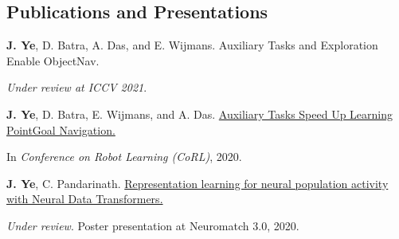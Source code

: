\subsection*{Publications and Presentations}
    \textbf{J. Ye}, D. Batra, A. Das, and E. Wijmans. Auxiliary Tasks and Exploration Enable ObjectNav.

    \emph{Under review at ICCV 2021}.

    \textbf{J. Ye}, D. Batra, E. Wijmans, and A. Das.
    \href{https://arxiv.org/abs/2007.04561}
    {Auxiliary Tasks Speed Up Learning PointGoal Navigation.}

    In \emph{Conference on Robot Learning (CoRL)}, 2020.

    \textbf{J. Ye}, C. Pandarinath. \href{https://www.youtube.com/watch?v=lEXSdoIGNWY}
    {Representation learning for neural population activity with Neural Data Transformers.}

    \emph{Under review}. Poster presentation at Neuromatch 3.0, 2020.
